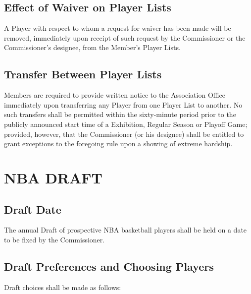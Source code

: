 \documentclass[]{book}
\theoremstyle{definition}
\theoremstyle{definition}
\theoremstyle{definition}
\theoremstyle{remark}
\begin{document}
\subsection{Effect of Waiver on Player
Lists}\label{effect-of-waiver-on-player-lists}

A Player with respect to whom a request for waiver has been made will be
removed, immediately upon receipt of such request by the Commissioner or
the Commissioner's designee, from the Member's Player Lists.

\subsection{Transfer Between Player
Lists}\label{transfer-between-player-lists}

Members are required to provide written notice to the Association Office
immediately upon transferring any Player from one Player List to
another. No such transfers shall be permitted within the sixty-minute
period prior to the publicly announced start time of a Exhibition,
Regular Season or Playoff Game; provided, however, that the Commissioner
(or his designee) shall be entitled to grant exceptions to the foregoing
rule upon a showing of extreme hardship.

\section{NBA DRAFT}\label{nba-draft}

\subsection{Draft Date}\label{draft-date}

The annual Draft of prospective NBA basketball players shall be held on
a date to be fixed by the Commissioner.

\subsection{Draft Preferences and Choosing
Players}\label{draft-preferences-and-choosing-players}

Draft choices shall be made as follows:
\end{document}
